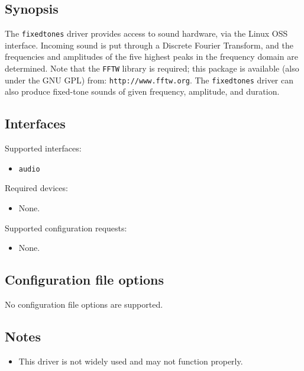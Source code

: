 \subsection*{Synopsis}
The {\tt fixedtones} driver provides access to sound hardware, via the Linux
OSS interface.  Incoming sound is put through a Discrete Fourier Transform,
and the frequencies and amplitudes of the five highest peaks in the frequency
domain are determined.  Note that the {\tt FFTW} library is required; this
package is available (also under the GNU GPL) from: {\tt http://www.fftw.org}.
The {\tt fixedtones} driver can also produce fixed-tone sounds of given
frequency, amplitude, and duration.


\subsection*{Interfaces}

\noindent Supported interfaces:
\begin{itemize}
\item {\tt audio}
\end{itemize}

\noindent Required devices:
\begin{itemize}
\item None.
\end{itemize}

\noindent Supported configuration requests:
\begin{itemize}
\item None.
\end{itemize}


\subsection*{Configuration file options}
No configuration file options are supported.

\subsection*{Notes}
\begin{itemize}
\item This driver is not widely used and may not function properly.
\end{itemize}
